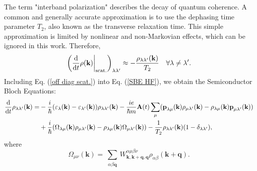 \documentclass[12pt,english,a4paper]{article}
\begin{document}
\quad The term "interband polarization" describes the decay of quantum coherence. A common and generally accurate approximation is to use the dephasing time parameter $T_2$, also known as the transverse relaxation time. This simple approximation is limited by nonlinear and non-Markovian effects, which can be ignored in this work. Therefore,
\begin{equation}
	\label{off diag scat.}
	\bigg(\dv{ }{t} \rho(\textbf{k})\bigg|_{\mathrm{scat.}}\bigg)_{\lambda \lambda'} \approx -\frac{\rho_{\lambda \lambda'}(\textbf{k})}{T_2}\quad \forall \lambda \neq \lambda'. 
\end{equation}
Including Eq. (\ref{off diag scat.}) into Eq. (\ref{SBE HF}), we obtain the Semiconductor Bloch Equations\cite{haug_quantum_2009}:
\begin{align}
	\label{SBE}
	\dv{ }{t}\rho_{\lambda\lambda'}(\textbf{k}) = &- \frac{i}{\hbar} (\varepsilon_\lambda(\textbf{k}) - \varepsilon_{\lambda'} (\textbf{k}))\rho_{\lambda \lambda'}(\textbf{k}) - \frac{ie}{\hbar m} \textbf{A}(t)\sum_{\mu}(\textbf{p}_{\lambda\mu}(\textbf{k})\rho_{\mu \lambda'}(\textbf{k}) - \rho_{\lambda\mu}(\textbf{k})\textbf{p}_{\mu \lambda'}(\textbf{k})) \nonumber \\
	&+ \frac{i}{\hbar}(\Omega_{\lambda \mu}(\textbf{k})\rho_{\mu \lambda'}(\textbf{k}) - \rho_{\lambda\mu}(\textbf{k}) \Omega_{\mu \lambda'} (\textbf{k})) -\frac{1}{T_2}\rho_{\lambda\lambda'}(\textbf{k})(1-\delta_{\lambda\lambda'}),
\end{align}
\quad where
\begin{equation}
	\Omega_{\mu\nu} (\textbf{k})=\sum_{\substack{\alpha\beta \textbf{q}}} W^{\alpha \mu \beta \nu}_{\textbf{k},\textbf{k}+\textbf{q},\textbf{q}} \rho_{\alpha\beta} (\textbf{k}+\textbf{q}).
\end{equation}
\end{document}
